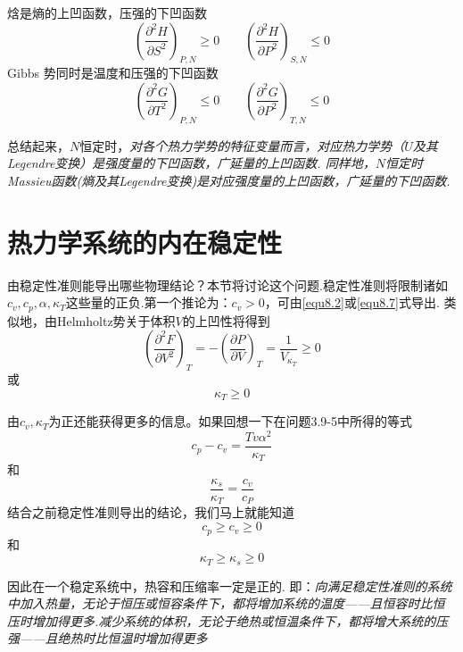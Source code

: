 焓是熵的上凹函数，压强的下凹函数
\begin{equation}
\label{equ8.14}
\left(\frac{\partial^2 H}{\partial S^2}\right)_{P,N}\geq 0\qquad \left(\frac{\partial^2 H}{\partial P^2}\right)_{S,N}\leq 0
\end{equation}
Gibbs 势同时是温度和压强的下凹函数
\begin{equation}
\label{equ8.15}
\left(\frac{\partial^2 G}{\partial T^2}\right)_{P,N}\leq 0\qquad \left(\frac{\partial^2 G}{\partial P^2}\right)_{T,N}\leq 0
\end{equation}

总结起来，$N$恒定时，{\it 对各个热力学势的特征变量而言，对应热力学势（$U$及其Legendre变换）是强度量的下凹函数，广延量的上凹函数. 同样地，$N$恒定时Massieu函数(熵及其Legendre变换)是对应强度量的上凹函数，广延量的下凹函数.}

\section{热力学系统的内在稳定性}
\label{sec8.3}
由稳定性准则能导出哪些物理结论？本节将讨论这个问题.稳定性准则将限制诸如$c_v, c_p,\alpha,\kappa_T$这些量的正负.第一个推论为：$c_v>0$，可由\eqref{equ8.2}或\eqref{equ8.7}式导出. 类似地，由Helmholtz势关于体积$V$的上凹性将得到
\begin{equation}
\label{equ8.16}
\left(\frac{\partial^2F}{\partial V^2}\right)_T=-\left(\frac{\partial P}{\partial V}\right)_T=\frac{1}{V_{\kappa_T}}\ge 0
\end{equation}
或
\begin{equation}
\label{equ8.17}
\kappa_T\ge 0
\end{equation}

由$c_v, \kappa_T$为正还能获得更多的信息。如果回想一下在问题3.9-5中所得的等式
\begin{equation}
\label{equ8.18}
c_p-c_v=\frac{Tv\alpha^2}{\kappa_T}
\end{equation}
和
\begin{equation}
\frac{\kappa_s}{\kappa_T}=\frac{c_v}{c_P}
\end{equation}
结合之前稳定性准则导出的结论，我们马上就能知道
\begin{equation}
c_p\ge c_v\ge 0
\end{equation}
和
\begin{equation}
\kappa_T\ge\kappa_s\ge 0
\end{equation}

因此在一个稳定系统中，热容和压缩率一定是正的. 即：\textsl{向满足稳定性准则的系统中加入热量，无论于恒压或恒容条件下，都将增加系统的温度——且恒容时比恒压时增加得更多.减少系统的体积，无论于绝热或恒温条件下，都将增大系统的压强——且绝热时比恒温时增加得更多}


